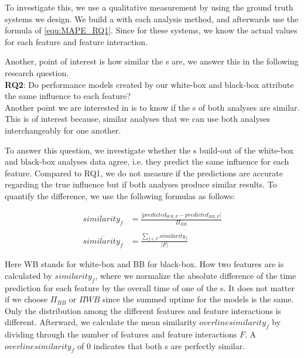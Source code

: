 To investigate this, we use a qualitative measurement by using the ground truth systems we design. 
We build a {\perfInfluenceModel} with each analysis method, and afterwards use the formula of \autoref{equ:MAPE_RQ1}. 
Since for these systems, we know the actual values for each feature and feature interaction.

Another, point of interest is how similar the {\perfInfluenceModel}s are, we answer this in the following research question.\\

\noindent \textbf{RQ2}: Do performance models created by our white-box and black-box attribute the same influence to each feature?\\

Another point we are interested in is to know if the {\perfInfluenceModel}s of both analyses are similar.
This is of interest because, similar analyses that we can use both analyses interchangeably for one another.

To answer this question, we investigate whether the {\perfInfluenceModel}s build-out of the white-box and black-box analyses data agree, i.e.
they predict the same influence for each feature. 
Compared to RQ1, we do not measure if the predictions are accurate regarding the true influence but if both analyses produce similar results. 
To quantify the difference, we use the following formulas as follows:

\begin{align}
    similarity_f &= \frac{\lvert predicted_{WB,F} - predicted_{BB,F} \rvert}{\Pi_{BB}} \label{equ:APE_RQ1} \\ \nonumber \\
    \overline{similarity_f}  &=  \frac{\sum_{f \in F} similarity_f}{\lvert F \rvert} \label{equ:MAPE_RQ1}
\end{align}

Here WB stands for white-box and BB for black-box. How two features are is calculated by $similarity_f$, 
where we normalize the absolute difference of the time prediction for each feature by the overall time of one of the {\perfInfluenceModel}s. 
It does not matter if we choose $\Pi_{BB}$ or $\Pi{WB}$ since the summed uptime for the models is the same. 
Only the distribution among the different features and feature interactions is different. 
Afterward, we calculate the mean similarity $overline{similarity_f}$ by dividing through the number of features and feature interactions $F$. 
A $overline{similarity_f}$ of 0 indicates that both {\perfInfluenceModel}s are perfectly similar.


